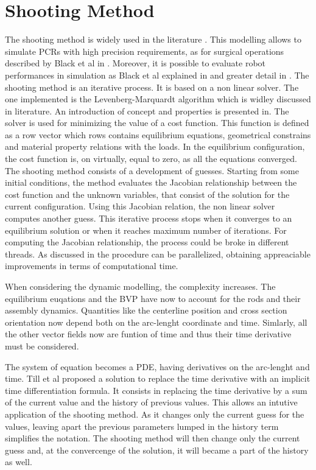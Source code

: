 \documentclass{thesisreport}
\begin{document}
 \section{Shooting Method}
 The shooting method is widely used in the literature \cite{black_parallel_2018}\cite{florian_geometrically_2020}\cite{black_modeling_2017}. This modelling allows to simulate PCRs with high precision requirements, as for surgical operations described by Black et al in \cite{black_modeling_2017}. Moreover, it is possible to evaluate robot performances in simulation as Black et al explained in \cite{black_parallel_2018} and greater detail in \cite{black_modeling_2017}. The shooting method is an iterative process. It is based on a non linear solver. The one implemented is the Levenberg-Marquardt algorithm which is widley discussed in literature. An introduction of concept and properties is presented in\cite{lourakis_brief_nodate}. 
 The solver is used for minimizing the value of a cost function\cite{florian_geometrically_2020}. This function is defined as a row vector which rows contains equilibrium equations, geometrical constrains and material property relations with the loads. In the equilibrium configuration, the cost function is, on virtually, equal to zero, as all the equations converged. 
 The shooting method consists of a development of guesses. Starting from some initial conditions, the method evaluates the Jacobian relationship between the cost function and the unknown variables, that consist of the solution for the current configuration. Using this Jacobian relation, the non linear solver computes another guess. This iterative process stops when it converges to an equilibrium solution or when it reaches maximum number of iterations. For computing the Jacobian relationship, the process could be broke in different threads. As discussed in \cite{till_efficient_2015} the procedure can be parallelized, obtaining appreaciable improvements in terms of computational time.  
 
 When considering the dynamic modelling, the complexity increases. The equilibrium euqations and the BVP have now to account for the rods and their assembly dynamics. Quantities like the centerline position and cross section orientation now depend both on the arc-lenght coordinate and time. Simlarly, all the other vector fields now are funtion of time and thus their time derivative must be considered. 
 
 The system of equation becomes a PDE, having derivatives on the arc-lenght and time. Till et al \cite{till_real-time_2019} proposed a solution to replace the time derivative with an implicit time differentiation formula. It consists in replacing the time derivative by a sum of the current value and the history of previous values. This allows an intutive application of the shooting method. As it changes only the current guess for the values, leaving apart the previous parameters lumped in the history term simplifies the notation. The shooting method will then change only the current guess and, at the convercenge of the solution, it will became a part of the history as well. 
 
\end{document}
